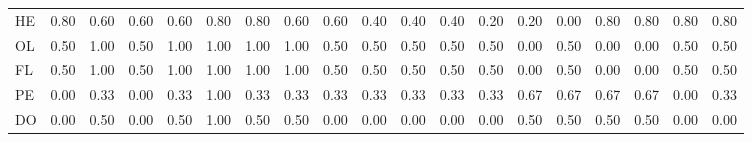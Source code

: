 \begin{table}[!h]
{\begin{tabular}[t]{lrrrrrrrrrrrrrrrrrr}
HE & 0.80 & 0.60 & 0.60 & 0.60 & 0.80 & 0.80 & 0.60 & 0.60 & 0.40 & 0.40 & 0.40 & 0.20 & 0.20 & 0.00 & 0.80 & 0.80 & 0.80 & 0.80\\
OL & 0.50 & 1.00 & 0.50 & 1.00 & 1.00 & 1.00 & 1.00 & 0.50 & 0.50 & 0.50 & 0.50 & 0.50 & 0.00 & 0.50 & 0.00 & 0.00 & 0.50 & 0.50\\
FL & 0.50 & 1.00 & 0.50 & 1.00 & 1.00 & 1.00 & 1.00 & 0.50 & 0.50 & 0.50 & 0.50 & 0.50 & 0.00 & 0.50 & 0.00 & 0.00 & 0.50 & 0.50\\
PE & 0.00 & 0.33 & 0.00 & 0.33 & 1.00 & 0.33 & 0.33 & 0.33 & 0.33 & 0.33 & 0.33 & 0.33 & 0.67 & 0.67 & 0.67 & 0.67 & 0.00 & 0.33\\
DO & 0.00 & 0.50 & 0.00 & 0.50 & 1.00 & 0.50 & 0.50 & 0.00 & 0.00 & 0.00 & 0.00 & 0.00 & 0.50 & 0.50 & 0.50 & 0.50 & 0.00 & 0.00\\
\bottomrule
\end{tabular}}
\end{table}

